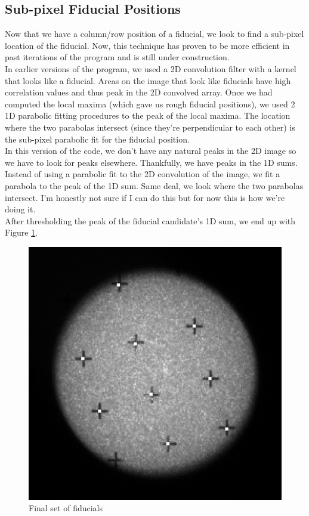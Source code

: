 \documentclass[10pt]{scrartcl}
\begin{document}
\subsection{Sub-pixel Fiducial Positions} %
\label{sub:sub_pixel_fiducial_positions}

Now that we have a column/row position of a fiducial, we look to find a sub-pixel location of the fiducial. Now, this technique has proven to be more efficient in past iterations of the program and is still under construction.\\
\indent In earlier versions of the program, we used a 2D convolution filter with a kernel that looks like a fiducial. Areas on the image that look like fiducials have high correlation values and thus peak in the 2D convolved array. Once we had computed the local maxima (which gave us rough fiducial positions), we used 2 1D parabolic fitting procedures to the peak of the local maxima. The location where the two parabolas intersect (since they're perpendicular to each other) is the sub-pixel parabolic fit for the fiducial position.\\
\indent In this version of the code, we don't have any natural peaks in the 2D image so we have to look for peaks elsewhere. Thankfully, we have peaks in the 1D sums. Instead of using a parabolic fit to the 2D convolution of the image, we fit a parabola to the peak of the 1D sum. Same deal, we look where the two parabolas intersect. I'm honestly not sure if I can do this but for now this is how we're doing it.\\
\indent After thresholding the peak of the fiducial candidate's 1D sum, we end up with Figure \ref{fiddone}.

\begin{figure}[!ht]
    \centering
    \includegraphics[width=.9\textwidth]{../plots_tables_images/fiddone.eps}
    \caption{Final set of fiducials}
    \label{fiddone}
\end{figure}
\end{document}
